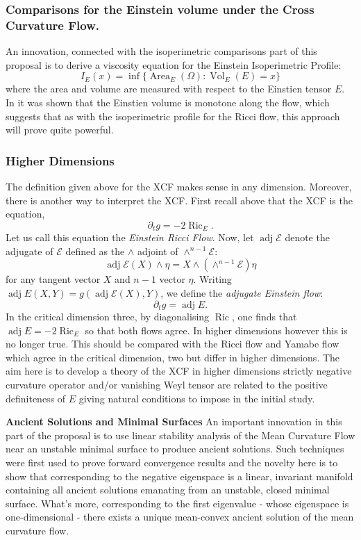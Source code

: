 \documentclass[12pt]{amsart}
\begin{document}
\subsubsection*{Comparisons for the Einstein volume under the Cross Curvature Flow.}
\label{sec-3-4-2}
An innovation, connected with the isoperimetric comparisons part of this proposal is to derive a viscosity equation for the Einstein Isoperimetric Profile:
\[
I_E (x) = \inf\{\operatorname{Area}_E (\Omega) : \operatorname{Vol}_E (E) = x\}
\]
where the area and volume are measured with respect to the Einstien tensor $E$. In \cite{MR2055396} it was shown that the Einstien volume is monotone along the flow, which suggests that as with the isoperimetric profile for the Ricci flow, this approach will prove quite powerful.

\subsubsection*{Higher Dimensions}
\label{sec-3-4-3}
The definition given above for the XCF makes sense in any dimension. Moreover, there is another way to interpret the XCF. First recall above that the XCF is the equation,
\[
\partial_t g = -2 \operatorname{Ric}_E.
\]
Let us call this equation the \emph{Einstein Ricci Flow}. Now, let $\operatorname{adj} \mathcal{E}$ denote the adjugate of $\mathcal{E}$ defined as the $\wedge$ adjoint of $\wedge^{n-1} \mathcal{E}$:
\[
\operatorname{adj} \mathcal{E} (X) \wedge \eta = X \wedge (\wedge^{n-1} \mathcal{E}) \eta
\]
for any tangent vector $X$ and $n-1$ vector $\eta$. Writing $\operatorname{adj} E (X, Y) = g(\operatorname{adj} \mathcal{E} (X), Y)$, we define the \emph{adjugate Einstein flow}:
\[
\partial_t g = \operatorname{adj} E.
\]
In the critical dimension three, by diagonalising $\operatorname{Ric}$, one finds that $\operatorname{adj} E = -2\operatorname{Ric}_E$ so that both flows agree. In higher dimensions however this is no longer true. This should be compared with the Ricci flow and Yamabe flow which agree in the critical dimension, two but differ in higher dimensions. The aim here is to develop a theory of the XCF in higher dimensions strictly negative curvature operator and/or vanishing Weyl tensor are related to the positive definiteness of $E$ giving natural conditions to impose in the initial study.

\noindent\textbf{Ancient Solutions and Minimal Surfaces}
\label{sec-3-5}
An important innovation in this part of the proposal is to use linear stability analysis of the Mean Curvature Flow near an unstable minimal surface to produce ancient solutions. Such techniques were first used to prove forward convergence results \cite{MR1485470} and the novelty here is to show that corresponding to the negative eigenspace is a linear, invariant manifold containing all ancient solutions emanating from an unstable, closed minimal surface. What's more, corresponding to the first eigenvalue - whose eigenspace is one-dimensional - there exists a unique mean-convex ancient solution of the mean curvature flow.
\end{document}
